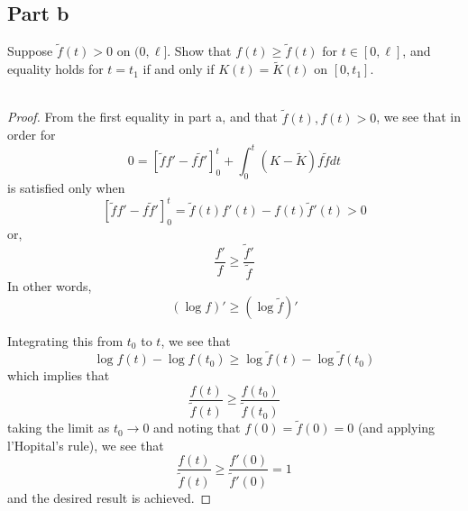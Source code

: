\documentclass[fontsize=11pt]{scrartcl} %
\numberwithin{equation}{section} %
\numberwithin{figure}{section} %
\numberwithin{table}{section} %
\begin{document}
\subsection*{Part b}
Suppose $\tilde{f}(t)>0$ on $(0,\ell]$. Show that $f(t)\geq \tilde{f}(t)$ for
$t\in [0,\ell]$, and equality holds for $t=t_1$ if and only if
$K(t)=\tilde{K}(t)$ on $[0,t_1]$.
\\
\\
\begin{proof}
    From the first equality in part a, and that $\tilde{f}(t),f(t)>0$, we see
    that in order for
    \[
    0 = [\tilde{f}f' - f\tilde{f}']_0^t +
    \int_0^t(K-\tilde{K})f\tilde{f}dt
    \]
    is satisfied only when
    \[
        [\tilde{f}f' - f\tilde{f}']_0^t = \tilde{f}(t)f'(t) -
        f(t)\tilde{f}'(t) > 0
    \]
    or,
    \[
        \frac{f'}{f}\geq \frac{\tilde{f}'}{\tilde{f}}
    \]
    In other words,
    \[
        (\log f)'\geq (\log \tilde{f})'
    \]

    Integrating this from $t_0$ to $t$, we see that
    \[
        \log f(t) - \log f(t_0)\geq \log \tilde{f}(t) - \log\tilde{f}(t_0)
    \]
    which implies that
    \[
        \frac{f(t)}{\tilde{f}(t)}\geq \frac{f(t_0)}{\tilde{f}(t_0)}
    \]
    taking the limit as $t_0\to 0$ and noting that $f(0)=\tilde{f}(0)=0$ (and
    applying l'Hopital's rule), we see that
    \[
        \frac{f(t)}{\tilde{f}(t)}\geq \frac{f'(0)}{\tilde{f}'(0)} = 1
    \]
    and the desired result is achieved.
\end{proof}

\newpage
\end{document}
